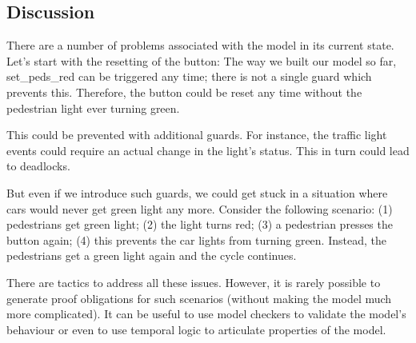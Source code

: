 \subsection{Discussion}
\label{tut_concepts_discussion2}

There are a number of problems associated with the model in its current state.  Let's start with the resetting of the button: The way we built our model so far, \textsf{set\_peds\_red} can be triggered any time; there is not a single guard which prevents this.  Therefore, the button could be reset any time without the pedestrian light ever turning green.

This could be prevented with additional guards. For instance, the traffic light events could require an actual change in the light's status.  This in turn could lead to deadlocks.

But even if we introduce such guards, we could get stuck in a situation where cars would never get green light any more.  Consider the following scenario: (1) pedestrians get green light; (2) the light turns red; (3) a pedestrian presses the button again; (4) this prevents the car lights from turning green. Instead, the pedestrians get a green light again and the cycle continues.

There are tactics to address all these issues.  However, it is rarely possible to generate proof obligations for such scenarios (without making the model much more complicated).  It can be useful to use model checkers to validate the model's behaviour or even to use temporal logic to articulate properties of the model.



